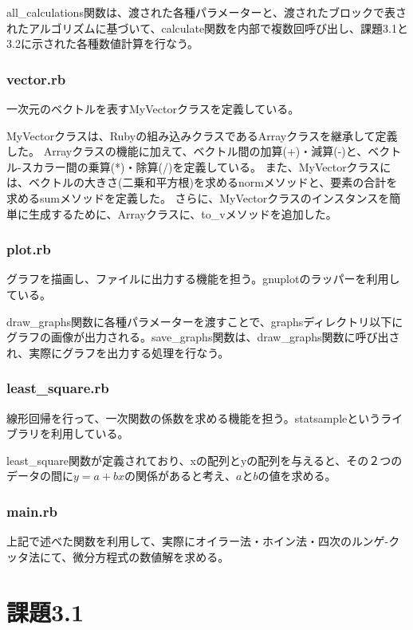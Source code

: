 \documentclass[11pt]{jsarticle}
\begin{document}
                all\_calculations関数は、渡された各種パラメーターと、渡されたブロックで表されたアルゴリズムに基づいて、calculate関数を内部で複数回呼び出し、課題3.1と3.2に示された各種数値計算を行なう。

            \subsubsection*{vector.rb}
                一次元のベクトルを表すMyVectorクラスを定義している。

                MyVectorクラスは、Rubyの組み込みクラスであるArrayクラスを継承して定義した。
                Arrayクラスの機能に加えて、ベクトル間の加算(+)・減算(-)と、ベクトル-スカラー間の乗算(*)・除算(/)を定義している。
                また、MyVectorクラスには、ベクトルの大きさ(二乗和平方根)を求めるnormメソッドと、要素の合計を求めるsumメソッドを定義した。
                さらに、MyVectorクラスのインスタンスを簡単に生成するために、Arrayクラスに、to\_vメソッドを追加した。

            \subsubsection*{plot.rb}
                グラフを描画し、ファイルに出力する機能を担う。gnuplotのラッパーを利用している。

                draw\_graphs関数に各種パラメーターを渡すことで、graphsディレクトリ以下にグラフの画像が出力される。save\_graphs関数は、draw\_graphs関数に呼び出され、実際にグラフを出力する処理を行なう。

            \subsubsection*{least\_square.rb}
                線形回帰を行って、一次関数の係数を求める機能を担う。statsampleというライブラリを利用している。

                least\_square関数が定義されており、xの配列とyの配列を与えると、その２つのデータの間に$y=a+bx$の関係があると考え、$a$と$b$の値を求める。

            \subsubsection*{main.rb}
                上記で述べた関数を利用して、実際にオイラー法・ホイン法・四次のルンゲ-クッタ法にて、微分方程式の数値解を求める。

    \section{課題3.1}
    
\end{document}
